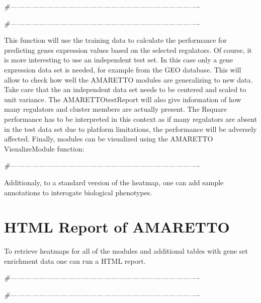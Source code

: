 \documentclass[8pt,a4,]{article}
\newcommand{\hlcom}[1]{\textcolor[rgb]{0.502,0.502,0.502}{\textit{#1}}}%
\newenvironment{Shaded}{\begin{myshaded}}{\end{myshaded}}
\newcommand{\CommentTok}[1]{\hlcom{#1}}
\begin{document}
\begin{Shaded}
\begin{Highlighting}[]
\CommentTok{#-------------------------------------------------------------------------------}



\CommentTok{#-------------------------------------------------------------------------------}
\end{Highlighting}
\end{Shaded}

This function will use the training data to calculate the performance
for predicting genes expression values based on the selected regulators.
Of course, it is more interesting to use an independent test set. In
this case only a gene expression data set is needed, for example from
the GEO database. This will allow to check how well the AMARETTO modules
are generalizing to new data. Take care that the an independent data set
needs to be centered and scaled to unit variance. The AMARETTOtestReport
will also give information of how many regulators and cluster members
are actually present. The Rsquare performance has to be interpreted in
this context as if many regulators are absent in the test data set due
to platform limitations, the performance will be adversely affected.
Finally, modules can be visualized using the AMARETTO VisualizeModule
function:

\begin{Shaded}
\begin{Highlighting}[]
\CommentTok{#-------------------------------------------------------------------------------}
\end{Highlighting}
\end{Shaded}

Additionaly, to a standard version of the heatmap, one can add sample
annotations to interogate biological phenotypes.

\newpage

\section{HTML Report of AMARETTO}\label{html-report-of-amaretto}

To retrieve heatmaps for all of the modules and additional tables with
gene set enrichment data one can run a HTML report.

\begin{Shaded}
\begin{Highlighting}[]
\CommentTok{#-------------------------------------------------------------------------------}



\CommentTok{#-------------------------------------------------------------------------------}
\end{Highlighting}
\end{Shaded}
\end{document}
